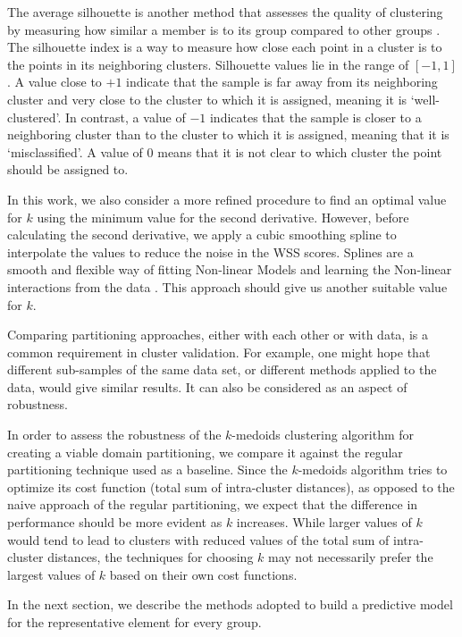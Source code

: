 The average silhouette is another method that assesses the quality of clustering by measuring how similar a member is to its group compared to other groups \cite{Rousseeuw1987}. The silhouette index is a way to measure how close each point in a cluster is to the points in its neighboring clusters.  Silhouette values lie in the range of $[-1, 1]$. A value close to $+1$ indicate that the sample is far away from its neighboring cluster and very close to the cluster to which it is assigned, meaning it is `well-clustered'. In contrast, a value of $-1$ indicates that the sample is closer to a neighboring cluster than to the cluster to which it is assigned, meaning that it is `misclassified'. A value of $0$ means that it is not clear to which cluster the point should be assigned to. 

In this work, we also consider a more refined procedure to find an optimal value for $k$ using the minimum value for the second derivative. However, before calculating the second derivative, we apply a cubic smoothing spline to interpolate the values to reduce the noise in the WSS scores. Splines are a smooth and flexible way of fitting Non-linear Models and learning the Non-linear interactions from the data \cite{HastieTF2009}. This approach should give us another suitable value for $k$.

Comparing partitioning approaches, either with each other or with data, is a common requirement in cluster validation. For example, one might hope that different sub-samples of the same data set, or different methods applied to the data, would give similar results. It can also be considered as an aspect of robustness.

In order to assess the robustness of the $k$-medoids clustering algorithm for creating a viable domain partitioning, we compare it against the regular partitioning technique used as a baseline. Since the $k$-medoids algorithm tries to optimize its cost function (total sum of intra-cluster distances), as opposed to the naive approach of the regular partitioning, we expect that the difference in performance should be more evident as $k$ increases. While larger values of $k$ would tend to lead to clusters with reduced values of the total sum of intra-cluster distances, the techniques for choosing $k$ may not necessarily prefer the largest values of $k$ based on their own cost functions.

In the next section, we describe the methods adopted to build a predictive model for the representative element for every group.


